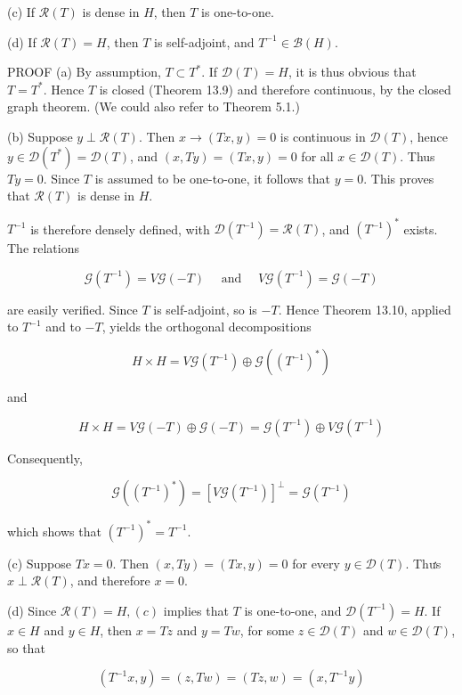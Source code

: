 \documentclass[10pt]{article}
\begin{document}
(c) If $\mathscr{R}(T)$ is dense in $H$, then $T$ is one-to-one.

(d) If $\mathscr{R}(T)=H$, then $T$ is self-adjoint, and $T^{-1} \in \mathscr{B}(H)$.

PROOF (a) By assumption, $T \subset T^{*}$. If $\mathscr{D}(T)=H$, it is thus obvious that $T=T^{*}$. Hence $T$ is closed (Theorem 13.9) and therefore continuous, by the closed graph theorem. (We could also refer to Theorem 5.1.)

(b) Suppose $y \perp \mathscr{R}(T)$. Then $x \rightarrow(T x, y)=0$ is continuous in $\mathscr{D}(T)$, hence $y \in \mathscr{D}\left(T^{*}\right)=\mathscr{D}(T)$, and $(x, T y)=(T x, y)=0$ for all $x \in \mathscr{D}(T)$. Thus $T y=0$. Since $T$ is assumed to be one-to-one, it follows that $y=0$. This proves that $\mathscr{R}(T)$ is dense in $H$.

$T^{-1}$ is therefore densely defined, with $\mathscr{D}\left(T^{-1}\right)=\mathscr{R}(T)$, and $\left(T^{-1}\right)^{*}$ exists. The relations

$$
\mathscr{G}\left(T^{-1}\right)=V \mathscr{G}(-T) \quad \text { and } \quad V \mathscr{G}\left(T^{-1}\right)=\mathscr{G}(-T)
$$

are easily verified. Since $T$ is self-adjoint, so is $-T$. Hence Theorem 13.10, applied to $T^{-1}$ and to $-T$, yields the orthogonal decompositions

$$
H \times H=V \mathscr{G}\left(T^{-1}\right) \oplus \mathscr{G}\left(\left(T^{-1}\right)^{*}\right)
$$

and

$$
H \times H=V \mathscr{G}(-T) \oplus \mathscr{G}(-T)=\mathscr{G}\left(T^{-1}\right) \oplus V \mathscr{G}\left(T^{-1}\right)
$$

Consequently,

$$
\mathscr{G}\left(\left(T^{-1}\right)^{*}\right)=\left[V \mathscr{G}\left(T^{-1}\right)\right]^{\perp}=\mathscr{G}\left(T^{-1}\right)
$$

which shows that $\left(T^{-1}\right)^{*}=T^{-1}$.

(c) Suppose $T x=0$. Then $(x, T y)=(T x, y)=0$ for every $y \in \mathscr{\mathscr { D }}(T)$. Thưs $x \perp \mathscr{R}(T)$, and therefore $x=0$.

(d) Since $\mathscr{R}(T)=H,(c)$ implies that $T$ is one-to-one, and $\mathscr{D}\left(T^{-1}\right)=H$. If $x \in H$ and $y \in H$, then $x=T z$ and $y=T w$, for some $z \in \mathscr{D}(T)$ and $w \in \mathscr{D}(T)$, so that

$$
\left(T^{-1} x, y\right)=(z, T w)=(T z, w)=\left(x, T^{-1} y\right)
$$
\end{document}
